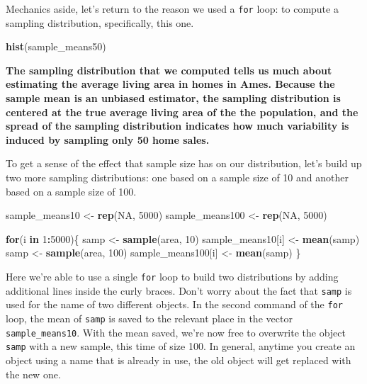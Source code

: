 \documentclass[]{book}
\newenvironment{Shaded}{\begin{snugshade}}{\end{snugshade}}
\newcommand{\ControlFlowTok}[1]{\textcolor[rgb]{0.13,0.29,0.53}{\textbf{#1}}}
\newcommand{\DecValTok}[1]{\textcolor[rgb]{0.00,0.00,0.81}{#1}}
\newcommand{\KeywordTok}[1]{\textcolor[rgb]{0.13,0.29,0.53}{\textbf{#1}}}
\newcommand{\NormalTok}[1]{#1}
\newcommand{\OperatorTok}[1]{\textcolor[rgb]{0.81,0.36,0.00}{\textbf{#1}}}
\newcommand{\OtherTok}[1]{\textcolor[rgb]{0.56,0.35,0.01}{#1}}
\newcommand{\StringTok}[1]{\textcolor[rgb]{0.31,0.60,0.02}{#1}}
\theoremstyle{definition}
\theoremstyle{definition}
\theoremstyle{definition}
\theoremstyle{remark}
\begin{document}
Mechanics aside, let's return to the reason we used a \texttt{for} loop:
to compute a sampling distribution, specifically, this one.

\begin{Shaded}
\begin{Highlighting}[]
\KeywordTok{hist}\NormalTok{(sample_means50)}
\end{Highlighting}
\end{Shaded}

\textbf{The sampling distribution that we computed tells us much about
estimating the average living area in homes in Ames. Because the sample
mean is an unbiased estimator, the sampling distribution is centered at
the true average living area of the the population, and the spread of
the sampling distribution indicates how much variability is induced by
sampling only 50 home sales.}

To get a sense of the effect that sample size has on our distribution,
let's build up two more sampling distributions: one based on a sample
size of 10 and another based on a sample size of 100.

\begin{Shaded}
\begin{Highlighting}[]
\NormalTok{sample_means10 <-}\StringTok{ }\KeywordTok{rep}\NormalTok{(}\OtherTok{NA}\NormalTok{, }\DecValTok{5000}\NormalTok{)}
\NormalTok{sample_means100 <-}\StringTok{ }\KeywordTok{rep}\NormalTok{(}\OtherTok{NA}\NormalTok{, }\DecValTok{5000}\NormalTok{)}

\ControlFlowTok{for}\NormalTok{(i }\ControlFlowTok{in} \DecValTok{1}\OperatorTok{:}\DecValTok{5000}\NormalTok{)\{}
\NormalTok{  samp <-}\StringTok{ }\KeywordTok{sample}\NormalTok{(area, }\DecValTok{10}\NormalTok{)}
\NormalTok{  sample_means10[i] <-}\StringTok{ }\KeywordTok{mean}\NormalTok{(samp)}
\NormalTok{  samp <-}\StringTok{ }\KeywordTok{sample}\NormalTok{(area, }\DecValTok{100}\NormalTok{)}
\NormalTok{  sample_means100[i] <-}\StringTok{ }\KeywordTok{mean}\NormalTok{(samp)}
\NormalTok{\}}
\end{Highlighting}
\end{Shaded}

Here we're able to use a single \texttt{for} loop to build two
distributions by adding additional lines inside the curly braces. Don't
worry about the fact that \texttt{samp} is used for the name of two
different objects. In the second command of the \texttt{for} loop, the
mean of \texttt{samp} is saved to the relevant place in the vector
\texttt{sample\_means10}. With the mean saved, we're now free to
overwrite the object \texttt{samp} with a new sample, this time of size
100. In general, anytime you create an object using a name that is
already in use, the old object will get replaced with the new one.
\end{document}
